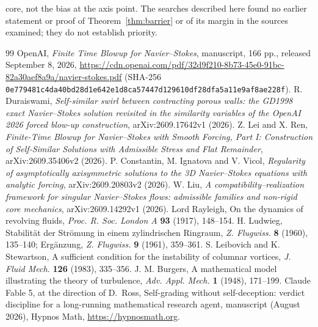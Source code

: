 \documentclass[11pt]{article}
\begin{document}
core, not the bias at the axis point. The searches described here found no earlier statement or proof of Theorem~\ref{thm:barrier} or of its margin in the sources examined; they do not establish priority.

\begin{thebibliography}{99}
 OpenAI, \emph{Finite Time Blowup for Navier--Stokes}, manuscript, 166 pp., released September 8, 2026, \url{https://cdn.openai.com/pdf/32d9f210-8b73-45e0-91bc-82a30aef8a9a/navier-stokes.pdf} (SHA-256 \texttt{0e779481c4da40bd28d1e642e1d8ca57447d129610df28dfa5a11e9af8ae228f}).
 R. Duraiswami, \emph{Self-similar swirl between contracting porous walls: the GD1998 exact Navier--Stokes solution revisited in the similarity variables of the OpenAI 2026 forced blow-up construction}, arXiv:2609.17642v1 (2026).
 Z. Lei and X. Ren, \emph{Finite-Time Blowup for Navier--Stokes with Smooth Forcing, Part I: Construction of Self-Similar Solutions with Admissible Stress and Flat Remainder}, arXiv:2609.35406v2 (2026).
 P. Constantin, M. Ignatova and V. Vicol, \emph{Regularity of asymptotically axisymmetric solutions to the 3D Navier--Stokes equations with analytic forcing}, arXiv:2609.20803v2 (2026).
 W. Liu, \emph{A compatibility--realization framework for singular Navier--Stokes flows: admissible families and non-rigid core mechanics}, arXiv:2609.14292v1 (2026).
 Lord Rayleigh, On the dynamics of revolving fluids, \emph{Proc. R. Soc. London A} \textbf{93} (1917), 148--154.
 H. Ludwieg, Stabilit\"at der Str\"omung in einem zylindrischen Ringraum, \emph{Z. Flugwiss.} \textbf{8} (1960), 135--140; Erg\"anzung, \emph{Z. Flugwiss.} \textbf{9} (1961), 359--361.
 S. Leibovich and K. Stewartson, A sufficient condition for the instability of columnar vortices, \emph{J. Fluid Mech.} \textbf{126} (1983), 335--356.
 J. M. Burgers, A mathematical model illustrating the theory of turbulence, \emph{Adv. Appl. Mech.} \textbf{1} (1948), 171--199.
 Claude Fable 5, at the direction of D.~Ross, Self-grading without self-deception: verdict discipline for a long-running mathematical research agent, manuscript (August 2026), Hypnos Math, \url{https://hypnosmath.org}.
\end{thebibliography}
\end{document}
